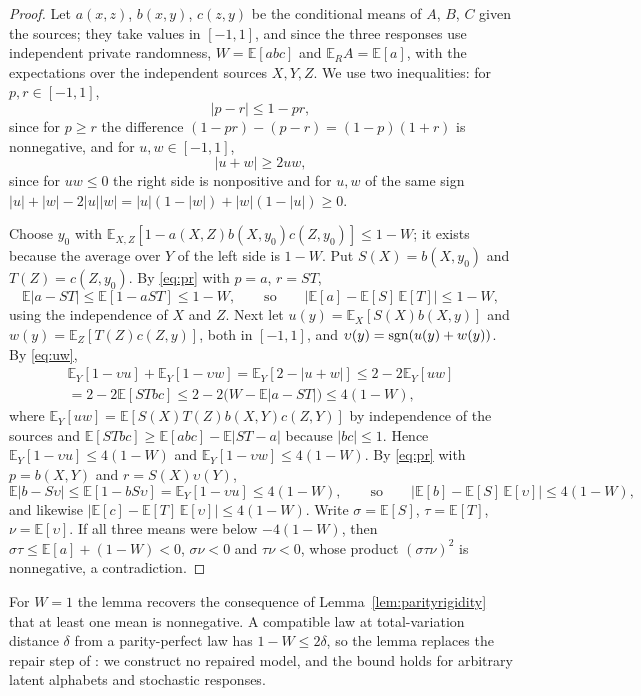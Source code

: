 \documentclass[11pt]{article}
\theoremstyle{plain}
\theoremstyle{definition}
\newcommand{\E}{\mathbb E}
\begin{document}
\begin{proof}
Let $a(x,z)$, $b(x,y)$, $c(z,y)$ be the conditional means of $A$, $B$, $C$ given the sources; they take values in $[-1,1]$, and since the three responses use independent private randomness, $W=\E[abc]$ and $\E_RA=\E[a]$, with the expectations over the independent sources $X,Y,Z$. We use two inequalities: for $p,r\in[-1,1]$,
\begin{equation}\label{eq:pr}
|p-r|\le1-pr,
\end{equation}
since for $p\ge r$ the difference $(1-pr)-(p-r)=(1-p)(1+r)$ is nonnegative, and for $u,w\in[-1,1]$,
\begin{equation}\label{eq:uw}
|u+w|\ge2uw,
\end{equation}
since for $uw\le0$ the right side is nonpositive and for $u,w$ of the same sign $|u|+|w|-2|u||w|=|u|(1-|w|)+|w|(1-|u|)\ge0$.

Choose $y_0$ with $\E_{X,Z}[1-a(X,Z)b(X,y_0)c(Z,y_0)]\le1-W$; it exists because the average over $Y$ of the left side is $1-W$. Put $S(X)=b(X,y_0)$ and $T(Z)=c(Z,y_0)$. By \eqref{eq:pr} with $p=a$, $r=ST$,
\[
\E|a-ST|\le\E[1-aST]\le1-W,\qquad\text{so}\qquad |\E[a]-\E[S]\,\E[T]|\le1-W,
\]
using the independence of $X$ and $Z$. Next let $u(y)=\E_X[S(X)b(X,y)]$ and $w(y)=\E_Z[T(Z)c(Z,y)]$, both in $[-1,1]$, and $\upsilon(y)=\operatorname{sgn}(u(y)+w(y))$. By \eqref{eq:uw},
\begin{multline*}
\E_Y[1-\upsilon u]+\E_Y[1-\upsilon w]=\E_Y[2-|u+w|]\le2-2\E_Y[uw]\\
=2-2\E[STbc]\le2-2\bigl(W-\E|a-ST|\bigr)\le4(1-W),
\end{multline*}
where $\E_Y[uw]=\E[S(X)T(Z)b(X,Y)c(Z,Y)]$ by independence of the sources and $\E[STbc]\ge\E[abc]-\E|ST-a|$ because $|bc|\le1$. Hence $\E_Y[1-\upsilon u]\le4(1-W)$ and $\E_Y[1-\upsilon w]\le4(1-W)$. By \eqref{eq:pr} with $p=b(X,Y)$ and $r=S(X)\upsilon(Y)$,
\[
\E|b-S\upsilon|\le\E[1-bS\upsilon]=\E_Y[1-\upsilon u]\le4(1-W),\qquad\text{so}\qquad|\E[b]-\E[S]\,\E[\upsilon]|\le4(1-W),
\]
and likewise $|\E[c]-\E[T]\,\E[\upsilon]|\le4(1-W)$. Write $\sigma=\E[S]$, $\tau=\E[T]$, $\nu=\E[\upsilon]$. If all three means were below $-4(1-W)$, then $\sigma\tau\le\E[a]+(1-W)<0$, $\sigma\nu<0$ and $\tau\nu<0$, whose product $(\sigma\tau\nu)^2$ is nonnegative, a contradiction.
\end{proof}
For $W=1$ the lemma recovers the consequence of Lemma~\ref{lem:parityrigidity} that at least one mean is nonnegative. A compatible law at total-variation distance $\delta$ from a parity-perfect law has $1-W\le2\delta$, so the lemma replaces the repair step of \cite{BoreiriEtAl2025}: we construct no repaired model, and the bound holds for arbitrary latent alphabets and stochastic responses.
\end{document}

